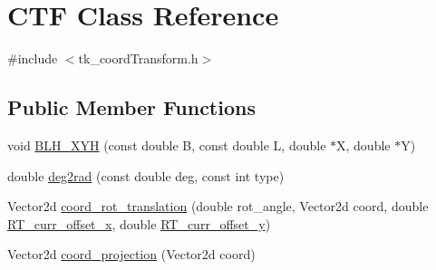 \hypertarget{class_c_t_f}{\section{C\-T\-F Class Reference}
\label{class_c_t_f}
}


{\ttfamily \#include $<$tk\-\_\-coord\-Transform.\-h$>$}

\subsection*{Public Member Functions}
\begin{DoxyCompactItemize}
\item 
void \hyperlink{class_c_t_f_a96b9cd32204da6f9d7b0904f5762624d}{B\-L\-H\-\_\-\-X\-Y\-H} (const double B, const double L, double $\ast$X, double $\ast$Y)
\item 
double \hyperlink{class_c_t_f_a0e0758fcf7e4b992f450ad3463f510de}{deg2rad} (const double deg, const int type)
\item 
Vector2d \hyperlink{class_c_t_f_a5e6aa0d6401a3bb658fdbc2b495f3583}{coord\-\_\-rot\-\_\-translation} (double rot\-\_\-angle, Vector2d coord, double \hyperlink{tk__global_8cpp_a4af6837c53e2ce993b55b4ada8fdf39d}{R\-T\-\_\-curr\-\_\-offset\-\_\-x}, double \hyperlink{tk__global_8cpp_ade9c28a8131302c3cc46eb3b5ebe4c3b}{R\-T\-\_\-curr\-\_\-offset\-\_\-y})
\item 
Vector2d \hyperlink{class_c_t_f_ad3d1f35ddadd5025cc7ddc06278b2610}{coord\-\_\-projection} (Vector2d coord)
\end{DoxyCompactItemize}


